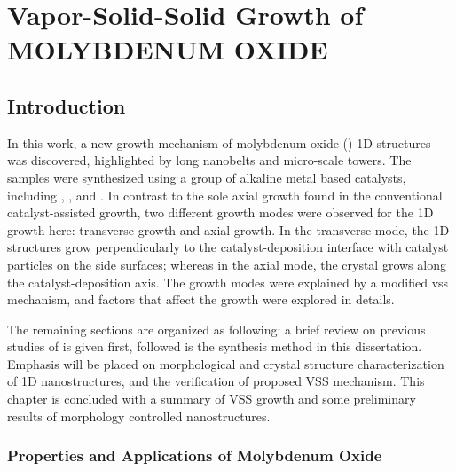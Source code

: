\chapter{Vapor-Solid-Solid Growth of MOLYBDENUM OXIDE}

\section{Introduction}

In this work, a new growth mechanism of molybdenum oxide () 1D structures was discovered, highlighted by  long nanobelts and micro-scale towers. The samples were synthesized using a group of alkaline metal based catalysts, including , , and . In contrast to the sole axial growth found in the conventional catalyst-assisted growth, two different growth modes were observed for the  1D growth here: transverse growth and axial growth. In the transverse mode, the 1D structures grow perpendicularly to the catalyst-deposition interface with catalyst particles on the side surfaces; whereas in the axial mode, the crystal grows along the catalyst-deposition axis. The growth modes were explained by a modified \gls{vss} mechanism, and factors that affect the growth were explored in details. 

The remaining sections are organized as following: a brief review on previous studies of  is given first, followed is the synthesis method in this dissertation. Emphasis will be placed on morphological and crystal structure characterization of 1D  nanostructures, and the verification of proposed VSS mechanism. This chapter is concluded with a summary of VSS growth and some preliminary results of morphology controlled  nanostructures. 

\subsection{Properties and Applications of Molybdenum Oxide}


